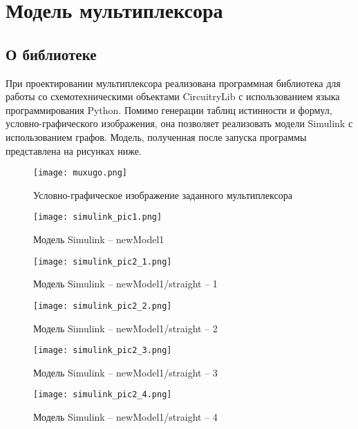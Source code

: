 \documentclass[document.tex]{subfiles}
\begin{document}
\section{Модель мультиплексора}
\subsection{О библиотеке}

При проектировании мультиплексора реализована программная библиотека для работы
со схемотехническими объектами CircuitryLib с использованием языка программирования
Python. Помимо генерации таблиц истинности и формул, условно-графического
изображения, она позволяет реализовать модели Simulink с использованием графов.
Модель, полученная после запуска программы представлена на рисунках ниже.

\begin{figure}[htb]
\begin{center}
\texttt{[image: muxugo.png]}
\caption{Условно-графическое изображение заданного мультиплексора}
\end{center}
\end{figure}

\begin{figure}[htb]
\begin{center}
\texttt{[image: simulink\_pic1.png]}
\caption{Модель Simulink -- newModel1}
\end{center}
\end{figure}

\begin{figure}[htb]
\begin{center}
\texttt{[image: simulink\_pic2\_1.png]}
\caption{Модель Simulink -- newModel1/straight -- 1}
\end{center}
\end{figure}

\begin{figure}[htb]
\begin{center}
\texttt{[image: simulink\_pic2\_2.png]}
\caption{Модель Simulink -- newModel1/straight -- 2}
\end{center}
\end{figure}

\begin{figure}[htb]
\begin{center}
\texttt{[image: simulink\_pic2\_3.png]}
\caption{Модель Simulink -- newModel1/straight -- 3}
\end{center}
\end{figure}

\begin{figure}[htb]
\begin{center}
\texttt{[image: simulink\_pic2\_4.png]}
\caption{Модель Simulink -- newModel1/straight -- 4}
\end{center}
\end{figure}
\end{document}
